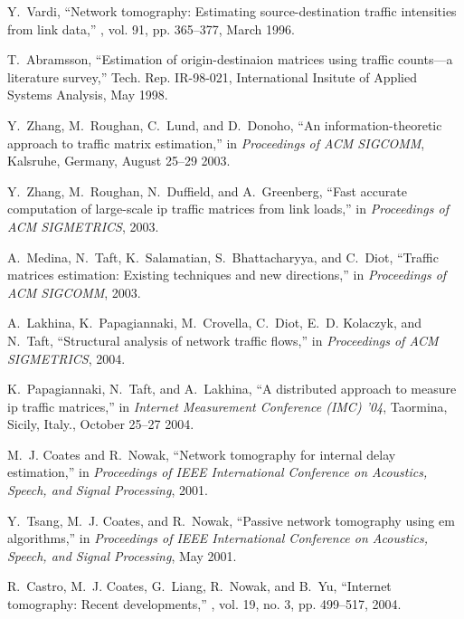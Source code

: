 \documentclass[11pt]{article}
\begin{document}
\begin{thebibliography}{10}

Y.~Vardi,
\newblock ``Network tomography: Estimating source-destination traffic
  intensities from link data,''
, vol. 91, pp.
  365--377, March 1996.

T.~Abramsson,
\newblock ``Estimation of origin-destinaion matrices using traffic counts---a
  literature survey,''
\newblock Tech. {R}ep. IR-98-021, International Insitute of Applied Systems
  Analysis, May 1998.

Y.~Zhang, M.~Roughan, C.~Lund, and D.~Donoho,
\newblock ``An information-theoretic approach to traffic matrix estimation,''
\newblock in {\em Proceedings of ACM SIGCOMM}, Kalsruhe, Germany, August 25--29
  2003.

Y.~Zhang, M.~Roughan, N.~Duffield, and A.~Greenberg,
\newblock ``Fast accurate computation of large-scale ip traffic matrices from
  link loads,''
\newblock in {\em Proceedings of ACM SIGMETRICS}, 2003.

A.~Medina, N.~Taft, K.~Salamatian, S.~Bhattacharyya, and C.~Diot,
\newblock ``Traffic matrices estimation: Existing techniques and new
  directions,''
\newblock in {\em Proceedings of ACM SIGCOMM}, 2003.

A.~Lakhina, K.~Papagiannaki, M.~Crovella, C.~Diot, E.~D. Kolaczyk, and N.~Taft,
\newblock ``Structural analysis of network traffic flows,''
\newblock in {\em Proceedings of ACM SIGMETRICS}, 2004.

K.~Papagiannaki, N.~Taft, and A.~Lakhina,
\newblock ``A distributed approach to measure ip traffic matrices,''
\newblock in {\em Internet Measurement Conference (IMC) '04}, Taormina, Sicily,
  Italy., October 25--27 2004.

M.~J. Coates and R.~Nowak,
\newblock ``Network tomography for internal delay estimation,''
\newblock in {\em Proceedings of IEEE International Conference on Acoustics,
  Speech, and Signal Processing}, 2001.

Y.~Tsang, M.~J. Coates, and R.~Nowak,
\newblock ``Passive network tomography using em algorithms,''
\newblock in {\em Proceedings of IEEE International Conference on Acoustics,
  Speech, and Signal Processing}, May 2001.

R.~Castro, M.~J. Coates, G.~Liang, R.~Nowak, and B.~Yu,
\newblock ``Internet tomography: Recent developments,''
, vol. 19, no. 3, pp. 499--517, 2004.


\end{thebibliography}
\end{document}

